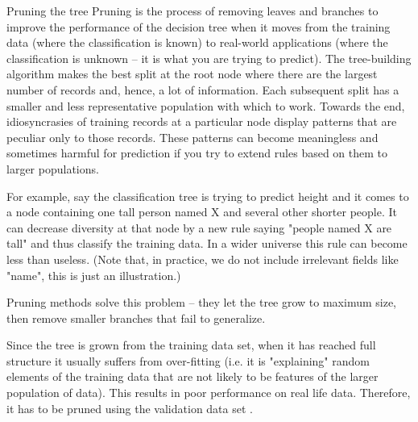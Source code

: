 
Pruning the tree
Pruning is the process of removing leaves and branches to improve the performance of the decision tree when it moves from the training data (where the classification is known) to real-world applications (where the classification is unknown -- it is what you are trying to predict). The tree-building algorithm makes the best split at the root node where there are the largest number of records and, hence, a lot of information. Each subsequent split has a smaller and less representative population with which to work. Towards the end, idiosyncrasies of training records at a particular node display patterns that are peculiar only to those records. These patterns can become meaningless and sometimes harmful for prediction if you try to extend rules based on them to larger populations.

For example, say the classification tree is trying to predict height and it comes to a node containing one tall person named X and several other shorter people. It can decrease diversity at that node by a new rule saying "people named X are tall" and thus classify the training data. In a wider universe this rule can become less than useless. (Note that, in practice, we do not include irrelevant fields like "name", this is just an illustration.)

Pruning methods solve this problem -- they let the tree grow to maximum size, then remove smaller branches that fail to generalize.

Since the tree is grown from the training data set, when it has reached full structure it usually suffers from over-fitting (i.e. it is "explaining" random elements of the training data that are not likely to be features of the larger population of data). This results in poor performance on real life data. Therefore, it has to be pruned using the validation data set .

